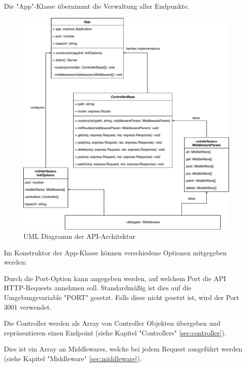 \label{sec:app}

Die "App"-Klasse übernimmt die Verwaltung aller Endpunkte.  

\begin{figure}[H]
    \centering
    \includegraphics[width=\textwidth]{media/APITemplate/apiArchitecture.svg.pdf}
    \caption{UML Diagramm der API-Architektur}
    \label{fig:apiUML}
\end{figure}

\pagebreak

Im Konstruktor der App-Klasse können verschiedene Optionen mitgegeben werden:


Durch die Port-Option kann angegeben werden, auf welchem Port die API HTTP-Requests annehmen soll. Standardmäßig ist dies auf die Umgebungsvariable "PORT" gesetzt. Falls diese nicht gesetzt ist, wird der Port 3001 verwendet.


Die Controller werden als Array von Controller Objekten übergeben und repräsentieren einen Endpoint (siehe Kapitel "Controllers" \ref{sec:controller}).


Dies ist ein Array an Middlewares, welche bei jedem Request ausgeführt werden (siehe Kapitel "Middleware" \ref{sec:middleware}).

